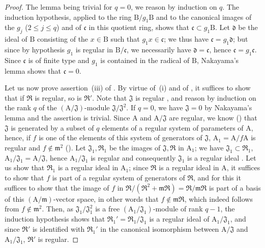 \begin{proof}
The lemma being trivial for $q=0$, we reason by induction on $q$.
The induction hypothesis, applied to the ring $\mathrm{B}/g_1\mathrm{B}$ and to the canonical images of the $g_j$ ($2\leq j\leq q$)
and of $\mathfrak{c}$ in this quotient ring, shows that $\mathfrak{c}\subset g_1\mathrm{B}$.
Let $\mathfrak{d}$ be the ideal of $\mathrm{B}$ consisting of the $x\in\mathrm{B}$ such that $g_1x\in\mathfrak{c}$; we thus have $\mathfrak{c}=g_1\mathfrak{d}$; but since by hypothesis $g_1$ is regular in $\mathrm{B}/\mathfrak{c}$, we necessarily have $\mathfrak{d}=\mathfrak{c}$, hence $\mathfrak{c}=g_1\mathfrak{c}$.
Since $\mathfrak{c}$ is of finite type and $g_1$ is contained in the radical of $\mathrm{B}$, Nakayama's lemma shows that $\mathfrak{c}=0$.

Let us now prove assertion~(iii) of .
By virtue of~(i) and of , it suffices to show that if $\mathfrak{R}$ is regular, so is $\mathfrak{R}'$.
Note that $\mathfrak{J}$ is regular , and reason by induction on the rank $q$ of the $(\mathrm{A}/\mathfrak{J})$-module $\mathfrak{J}/\mathfrak{J}^2$.
If $q=0$, we have $\mathfrak{J}=0$ by Nakayama's lemma and the assertion is trivial.
Since $\mathrm{A}$ and $\mathrm{A}/\mathfrak{J}$ are regular, we know () that $\mathfrak{J}$ is generated by a subset of $q$ elements of a regular system of parameters of $\mathrm{A}$, hence, if $f$ is one of the elements of this system of generators of $\mathfrak{J}$, $\mathrm{A}_1=\mathrm{A}/f\mathrm{A}$ is regular and $f\notin\mathfrak{m}^2$ ().
Let $\mathfrak{J}_1,\mathfrak{R}_1$ be the images of $\mathfrak{J},\mathfrak{R}$ in $\mathrm{A}_1$; we have $\mathfrak{J}_1\subset\mathfrak{R}_1$, $\mathrm{A}_1/\mathfrak{J}_1=\mathrm{A}/\mathfrak{J}$, hence $\mathrm{A}_1/\mathfrak{J}_1$ is regular and consequently $\mathfrak{J}_1$ is a regular ideal .
Let us show that $\mathfrak{R}_1$ is a regular ideal in $\mathrm{A}_1$; since $\mathfrak{R}$ is a regular ideal in $\mathrm{A}$, it suffices to show that $f$ is part of a regular system of generators of $\mathfrak{R}$, and for this  it suffices to show that the image of $f$ in $\mathfrak{R}/(\mathfrak{R}^2+\mathfrak{m}\mathfrak{R})=\mathfrak{R}/\mathfrak{m}\mathfrak{R}$ is part of a basis of this $(\mathrm{A}/\mathfrak{m})$-vector space, in other words that $f\notin\mathfrak{m}\mathfrak{R}$, which indeed follows from $f\notin\mathfrak{m}^2$.
Then, as $\mathfrak{J}_1/\mathfrak{J}_1^2$ is a free $(\mathrm{A}_1/\mathfrak{J}_1)$-module of rank $q-1$, the induction hypothesis shows that $\mathfrak{R}_1'=\mathfrak{R}_1/\mathfrak{J}_1$ is a regular ideal of $\mathrm{A}_1/\mathfrak{J}_1$, and since $\mathfrak{R}'$ is identified with $\mathfrak{R}_1'$ in the canonical isomorphism between $\mathrm{A}/\mathfrak{J}$ and $\mathrm{A}_1/\mathfrak{J}_1$, $\mathfrak{R}'$ is regular.
\end{proof}

